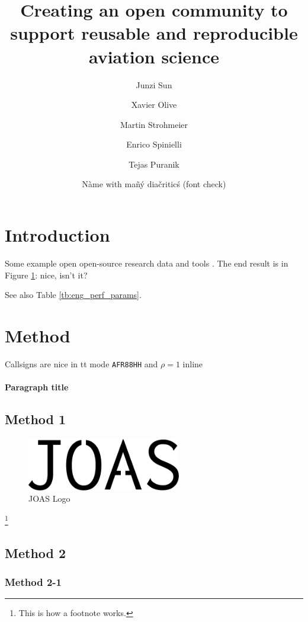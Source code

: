 \documentclass[
  manuscript=data,  %
  layout=preprint,  %
  year=20xx,
  volume=x,
]{joas}
\title{Creating an open community to support reusable and reproducible aviation science}
\author{Junzi Sun}
\affiliation{Joint first authors}
\author{Xavier Olive}
\affiliation{Joint first authors}
\author{Martin Strohmeier}
\affiliation{OpenSky Network, Switzerland}
\author{Enrico Spinielli}
\affiliation{EUROCONTROL, Belgium}
\author{Tejas Puranik}
\affiliation{NASA Ames Research Center, USA}
\author{Nàme with mañý diačriticś (font check)}
\affiliation{University of Syldavia}
\begin{document}
\begin{abstract}
  \blindtext
\end{abstract}


\section{Introduction}

\blindtext Some example open open-source research data \cite{schafer2014bringing} and tools \cite{olive2019traffic,sun2020openap}. The end result is in Figure \ref{fig:logo}: nice, isn't it?


\blindtext[2]

\blindtext See also Table \ref{tb:eng_perf_params}.


\section{Method}

Callsigns are nice in tt mode \texttt{AFR88HH} and $\rho = 1$ inline

\paragraph{Paragraph title} \blindtext

\subsection{Method 1}

\blindtext

\begin{figure}[ht!]
  \centering
  \includegraphics[width=0.6\textwidth]{joas-logo.pdf}
  \caption{JOAS Logo}
  \label{fig:logo}
\end{figure}

\blindtext\footnote{This is how a footnote works.}

\subsection{Method 2}

\subsubsection{Method 2-1}
\end{document}
